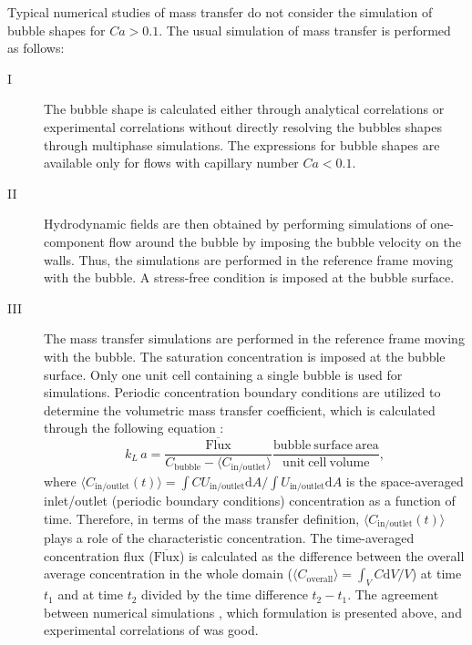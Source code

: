 \documentclass{article}
\newcommand{\vol}{k_L\,a}
\newcommand{\uinoutlet}{U_{\mathrm{in/outlet}}}
\newcommand{\cbubble}{C_{\mathrm{bubble}}}
\newcommand{\cinoutlet}{C_{\mathrm{in/outlet}}}
\newcommand{\coverall}{C_{\mathrm{overall}}}
\begin{document}
Typical numerical studies of mass transfer
\cite{kreutzer-overview,vanbaten-circular} do not consider the simulation of
bubble shapes for $Ca>0.1$. The usual simulation of mass transfer is performed as
follows: 
\begin{description}
 \item[I] The bubble shape is calculated either
through analytical correlations \cite{bretherton} or experimental correlations
\cite{cerro-bubble-train} without directly resolving the bubbles shapes through
multiphase simulations.  The expressions for bubble shapes are available only
for flows with capillary number $Ca<0.1$.
  \item[II] Hydrodynamic fields
are then obtained by performing simulations of one-component flow around the
bubble by imposing the bubble velocity on the walls. Thus, the simulations are
performed in the reference frame moving with the bubble. A stress-free
condition is imposed at the bubble surface.
  \item[III]  The mass transfer
simulations are performed in the reference frame moving with the bubble. The
saturation concentration is imposed at the bubble surface. Only one unit cell
containing a single bubble is used for simulations. Periodic concentration boundary conditions are
utilized to determine the volumetric mass transfer coefficient, which is
calculated through the following equation \cite{vanbaten-circular}:
\begin{equation} \label{main:simulation:equation}
\vol=\frac{\mathrm{\overline{Flux}}}{\cbubble-\langle\cinoutlet\rangle}
\frac{\mathrm{bubble\ surface\ area}}{\mathrm{unit\ cell\ volume}},
\end{equation}
 where $\langle\cinoutlet(t)\rangle=\int{C \uinoutlet
\mathrm{d}A}/\int{\uinoutlet\mathrm{d}A}$ is the space-averaged inlet/outlet (periodic boundary conditions)
concentration as a function of time. Therefore, in terms of the mass transfer definition, $\langle\cinoutlet(t)\rangle$ plays a role of the 
characteristic concentration.
The time-averaged
concentration flux ($\mathrm{\overline{Flux}}$) is calculated as the difference
between the overall average concentration in the whole domain
($\langle\coverall\rangle=\int_{V} C \mathrm{d}V /V$) at time $t_1$ and at time
$t_2$ divided by the time difference $t_2-t_1$. The agreement between numerical
simulations \cite{vanbaten-circular}, which formulation is presented above, and experimental correlations of \citet{bercic-mass}
was good. 
 \end{description}
\end{document}
